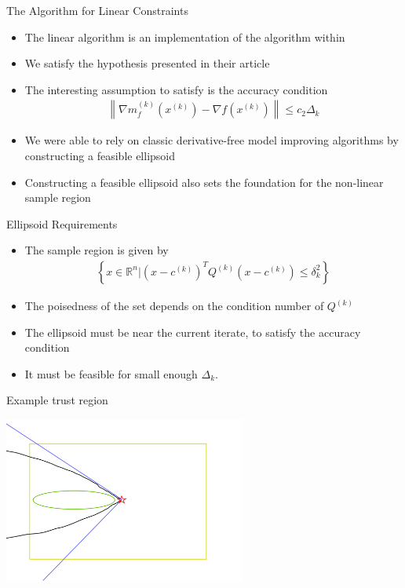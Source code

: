 \documentclass{beamer}
\newcommand{\Rn}{\mathbb R ^ {n}}
\newcommand{\dk}{{\Delta_k}}
\begin{document}
\begin{frame}{The Algorithm for Linear Constraints}
	\begin{itemize}
		\item The linear algorithm is an implementation of the algorithm within \cite{CONEJO2013324}
		\item We satisfy the hypothesis presented in their article
		\item The interesting assumption to satisfy is the accuracy condition
\begin{align*}
		\left\|\nabla m_f^{(k)}\left(x^{(k)}\right) - \nabla f \left(x^{(k)}\right)\right\| \le c_2 \Delta_k
\end{align*}
		\item We were able to rely on classic derivative-free model improving algorithms
		by constructing a feasible ellipsoid
		\item Constructing a feasible ellipsoid also sets the foundation for the non-linear sample region
	\end{itemize}
\end{frame}


\begin{frame}{Ellipsoid Requirements}
	\begin{itemize}
		\item The sample region is given by
\begin{align*}
\left\{x \in \Rn \bigg | \left(x - c^{(k)}\right)^TQ^{(k)}\left(x - c^{(k)}\right) \le \delta_k^2 \right\}
\end{align*}
		\item The poisedness of the set depends on the condition number of $Q^{(k)}$
		\item The ellipsoid must be near the current iterate, to satisfy the accuracy condition
		\item It must be feasible for small enough $\dk$.
	\end{itemize}
\end{frame}

\begin{frame}{Example trust region}
\begin{center}
	\includegraphics[width=300px]{images/trust_regions.png}
\end{center}
\end{frame}
\end{document}
